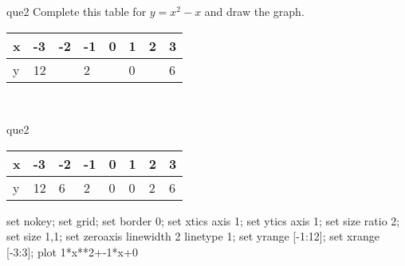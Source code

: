 \documentclass[13.5pt, varwidth=true]{beamer}
\begin{document}
\begin{frame}[shrink=19,fragile]
	\begin{beamercolorbox}[rounded=true, left, shadow=true,wd=14.8cm]{que2}
		 Complete this table for $y = x^{2} - x$ and draw the graph. \\[0.3cm] \renewcommand{\arraystretch}{1.2}\begin{tabular}{|C|C|C|C|C|C|C|C|} \hline x & -3 & -2 & -1 & 0 & 1 & 2 & 3 \\ \hline y & 12 &  & 2 &  & 0 &  & 6\\ \hline \end{tabular}\\[0.3cm]
	\end{beamercolorbox}
\end{frame}
\begin{frame}[shrink=19,fragile]
	\begin{beamercolorbox}[rounded=true, left, shadow=true,wd=14.8cm]{que2}
		\renewcommand{\arraystretch}{1.2}\begin{tabular}{|C|C|C|C|C|C|C|C|} \hline x & -3 & -2 & -1 & 0 & 1 & 2 & 3 \\ \hline y & 12 & 6 & 2 & 0 & 0 & 2 & 6\\ \hline \end{tabular}\begin{gnuplot}[terminal=pdf] set nokey; set grid; set border 0; set xtics axis 1; set ytics axis 1; set size ratio 2; set size 1,1; set zeroaxis linewidth 2 linetype 1; set yrange [-1:12]; set xrange [-3:3]; plot 1*x**2+-1*x+0 \end{gnuplot}
	\end{beamercolorbox}
\end{frame}
\end{document}
